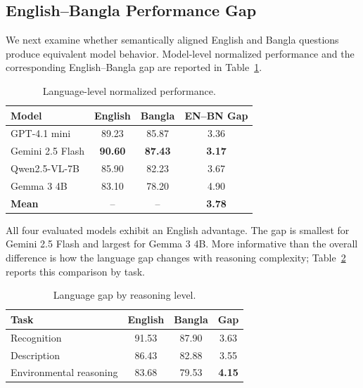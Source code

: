 \documentclass{article}
\begin{document}
\subsection{English--Bangla Performance Gap}
\label{subsec:language_gap}
We next examine whether semantically aligned English and Bangla questions produce equivalent model behavior. Model-level normalized performance and the corresponding English--Bangla gap are reported in Table~\ref{tab:language_model_gap}.
\begin{table}[t]
\centering
\caption{Language-level normalized performance. }
\label{tab:language_model_gap}
\begin{tabular}{lccc}
\toprule
\textbf{Model}
& \textbf{English}
& \textbf{Bangla}
& \textbf{EN--BN Gap} \\
\midrule
GPT-4.1 mini
& 89.23
& 85.87
& 3.36 \\

Gemini 2.5 Flash
& \textbf{90.60}
& \textbf{87.43}
& \textbf{3.17} \\

Qwen2.5-VL-7B
& 85.90
& 82.23
& 3.67 \\

Gemma 3 4B
& 83.10
& 78.20
& 4.90 \\

\midrule
\textbf{Mean}
& --
& --
& \textbf{3.78} \\
\bottomrule
\end{tabular}
\end{table}
All four evaluated models exhibit an English advantage. The gap is smallest for Gemini 2.5 Flash and largest for Gemma 3 4B. More informative than the overall difference is how the language gap changes with reasoning complexity; Table~\ref{tab:language_task_gap} reports this comparison by task.
\begin{table}[t]
\centering
\caption{Language gap by reasoning level. }
\label{tab:language_task_gap}
\begin{tabular}{lccc}
\toprule
\textbf{Task}
& \textbf{English}
& \textbf{Bangla}
& \textbf{Gap} \\
\midrule
Recognition
& 91.53
& 87.90
& 3.63 \\

Description
& 86.43
& 82.88
& 3.55 \\

Environmental reasoning
& 83.68
& 79.53
& \textbf{4.15} \\
\bottomrule
\end{tabular}
\end{table}
\end{document}
